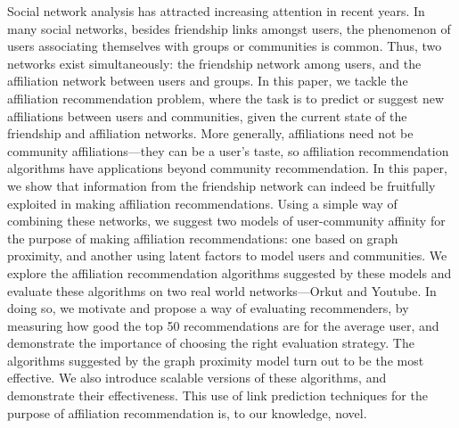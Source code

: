 Social network analysis has attracted increasing attention in recent years. In many social networks, besides friendship links amongst users, the phenomenon of users associating themselves with groups or communities is common. Thus, two networks exist simultaneously: the friendship network among users, and the affiliation network between users and groups. In this paper, we tackle the affiliation recommendation problem, where the task is to predict or suggest new affiliations between users and communities, given the current state of the friendship and affiliation networks. More generally, affiliations need not be community affiliations---they can be a user's taste, so affiliation recommendation algorithms have applications beyond community recommendation. In this paper, we show that information from the friendship network can indeed be fruitfully exploited in making affiliation recommendations. Using a simple way of combining these networks, we suggest two models of user-community affinity for the purpose of making affiliation recommendations: one based on graph proximity, and another using latent factors to model users and communities. 
We explore the affiliation recommendation algorithms suggested by these models and evaluate these algorithms on two real world networks---Orkut and Youtube. In doing so, we motivate and propose a way of evaluating recommenders, by measuring how good the top 50 recommendations are for the average user, and demonstrate the importance of choosing the right evaluation strategy. The algorithms suggested by the graph proximity model turn out to be the most effective. We also introduce scalable versions of these algorithms, and demonstrate their effectiveness. This use of link prediction techniques for the purpose of affiliation recommendation is, to our knowledge, novel.
